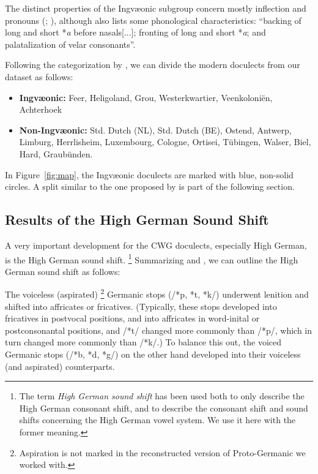 \documentclass[a4paper]{article}
\begin{document}
The distinct properties of the Ingv\ae{}onic subgroup
concern mostly inflection and pronouns
(\citet{stiles2013pan-west}; \citet[pp. 7-8]{harbert2007germanic}),
although \citet{stiles2013pan-west} also lists some phonological characteristics:
``backing of long and short *\textit{a} before nasals[...];
fronting of long and short *\textit{a};
and palatalization of velar consonants''.

Following the categorization by \citet{harbert2007germanic}, %
we can divide the modern doculects from our dataset as follows:

\begin{itemize}
\item 
\textbf{Ingv\ae{}onic:}
Feer, Heligoland, Grou,
Westerkwartier, Veenkoloni\"{e}n, Achterhoek

\item
\textbf{Non-Ingv\ae{}onic:}
Std. Dutch (NL), Std. Dutch (BE), Ostend, Antwerp, Limburg,
Herrlisheim, Luxembourg, Cologne,
Ortisei, T\"{u}bingen, Walser, Biel, Hard, Graub\"{u}nden.
\end{itemize}

In Figure~\ref{fig:map}, the Ingv\ae{}onic doculects
are marked with blue, non-solid circles.
A split similar to the one proposed by \citet{sonderegger1979grundzuege}
is part of the following section.

\subsection{Results of the High German Sound Shift}

A very important development for the CWG doculects,
especially High German, is the High German sound shift.
\footnote{
The term \textit{High German sound shift} has been used both
to only describe the High German consonant shift,
and to describe the consonant shift and sound shifts concerning
the High German vowel system.
We use it here with the former meaning.
}
Summarizing \citet[pp. 47--48]{harbert2007germanic}
and \citet[pp. 62--64]{koenig2015dtv},
we can outline the High German sound shift as follows:

The voiceless (aspirated)
\footnote{
Aspiration is not marked in the reconstructed version of Proto-Germanic
we worked with.
}
Germanic stops (/*p, *t, *k/)
underwent lenition and shifted into affricates or fricatives.
(Typically, these stops developed into fricatives in postvocal positions,
and into affricates in word-inital or postconsonantal positions,
and /*t/ changed more commonly than /*p/,
which in turn changed more commonly than /*k/.)
To balance this out,
the voiced Germanic stops (/*b, *d, *g/) on the other hand
developed into their voiceless (and aspirated) counterparts.
\end{document}
